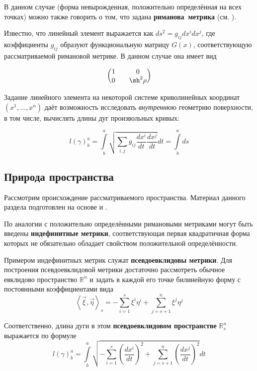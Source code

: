 \documentclass{article}
\numberwithin{equation}{section}
\newcommand{\neword}[1]{\textbf{#1}}
\newcommand{\scalmult}[2]{{\left \langle #1 \right \rangle}_{#2}}
\begin{document}
В данном случае (форма невырожденная, положительно определённая на
всех точках) можно также говорить о том, что задана
\neword{риманова метрика} (см. \cite{fomenko00}).

Известно, что линейный элемент выражается как
\mbox{$ds^2=g_{ij}dx^idx^j$}, где коэффициенты $g_{ij}$ образуют
функциональную матрицу $G(x)$, соответствующую рассматриваемой
римановой метрике. В данном случае она имеет вид

\begin{equation*}
  \begin{pmatrix}
    1 && 0 \\
    0 && \sh^2{\rho}
  \end{pmatrix}
\end{equation*}

Задание линейного элемента на некоторой системе криволинейных
координат $(x^1, \dotsc , x^n)$ даёт возможность исследовать
\emph{внутреннюю} геометрию поверхности, в том числе, вычислять длины
дуг произвольных кривых:

\begin{equation}\label{eq:riemann-curve-length}
  l(\gamma)^a_b = \int \limits^a_b {\sqrt{\sum_{i,j}{g_{ij}
        \frac{dx^i}{dt} \frac{dx^j}{dt}}} dt} = \int \limits^a_b ds
\end{equation}

\subsection{Природа пространства}
\label{sec:what-is-up}
Рассмотрим происхождение рассматриваемого пространства. Материал
данного раздела подготовлен на основе \cite{fomenko00} и
\cite{dubrovin98}.

По аналогии с положительно определёнными римановыми метриками могут
быть введены \neword{индефинитные метрики}, соответствующая первая
квадратичная форма которых не обязательно обладает свойством
положительной определённости.

Примером индефинитных метрик служат \neword{псевдоевклидовы метрики}.
Для построения псевдоевклидовой метрики достаточно рассмотреть обычное
евклидово пространство $\mathbb{R}^n$ и задать в каждой его точке
билинейную форму с постоянными коэффициентами вида
\begin{equation*}
  \scalmult{\vec{\xi}, \vec{\eta}}{s} = -\sum_{i=1}^s {\xi^i \eta^i} +
\sum_{j=s+1}^n {\xi^j \eta^j}
\end{equation*}

Соответственно, длина дуги в этом \neword{псевдоевклидовом
  пространстве} $\mathbb{R}^n_s$ выражается по формуле
\begin{equation*}
  l(\gamma)^a_b = \int \limits^a_b {\sqrt{-\sum_{i=1}^s{\left
          (\frac{dx^i}{dt} \right )}^2 + \sum_{j=s+1}^n{\left
          (\frac{dx^j}{dt} \right )}^2}dt}
\end{equation*}
\end{document}
